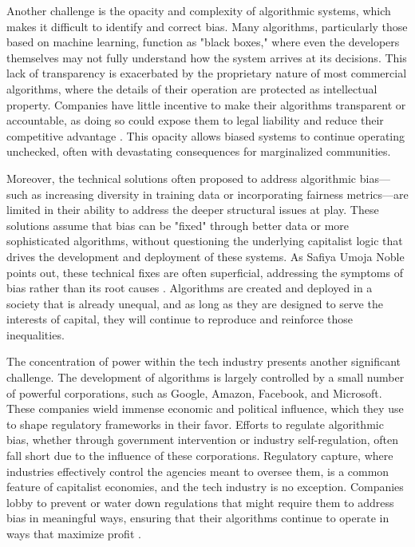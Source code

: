 \begin{refsection}
Another challenge is the opacity and complexity of algorithmic systems, which makes it difficult to identify and correct bias. Many algorithms, particularly those based on machine learning, function as "black boxes," where even the developers themselves may not fully understand how the system arrives at its decisions. This lack of transparency is exacerbated by the proprietary nature of most commercial algorithms, where the details of their operation are protected as intellectual property. Companies have little incentive to make their algorithms transparent or accountable, as doing so could expose them to legal liability and reduce their competitive advantage \cite[pp.~105-108]{pasquale2015}. This opacity allows biased systems to continue operating unchecked, often with devastating consequences for marginalized communities.

Moreover, the technical solutions often proposed to address algorithmic bias—such as increasing diversity in training data or incorporating fairness metrics—are limited in their ability to address the deeper structural issues at play. These solutions assume that bias can be "fixed" through better data or more sophisticated algorithms, without questioning the underlying capitalist logic that drives the development and deployment of these systems. As Safiya Umoja Noble points out, these technical fixes are often superficial, addressing the symptoms of bias rather than its root causes \cite[pp.~145-147]{noble2019}. Algorithms are created and deployed in a society that is already unequal, and as long as they are designed to serve the interests of capital, they will continue to reproduce and reinforce those inequalities.

The concentration of power within the tech industry presents another significant challenge. The development of algorithms is largely controlled by a small number of powerful corporations, such as Google, Amazon, Facebook, and Microsoft. These companies wield immense economic and political influence, which they use to shape regulatory frameworks in their favor. Efforts to regulate algorithmic bias, whether through government intervention or industry self-regulation, often fall short due to the influence of these corporations. Regulatory capture, where industries effectively control the agencies meant to oversee them, is a common feature of capitalist economies, and the tech industry is no exception. Companies lobby to prevent or water down regulations that might require them to address bias in meaningful ways, ensuring that their algorithms continue to operate in ways that maximize profit \cite[pp.~210-213]{birhane2021}.


\end{refsection}
